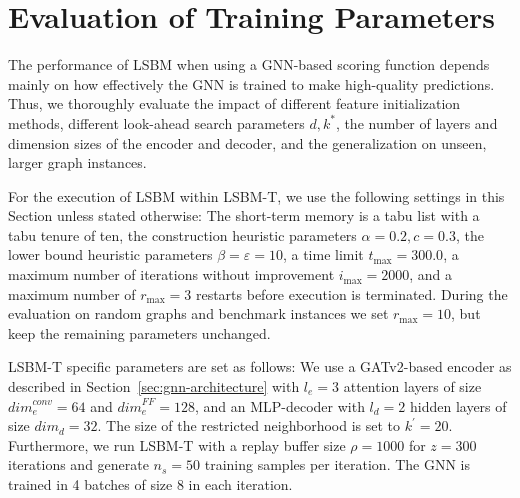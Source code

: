 \documentclass[draft,final]{vutinfth} %
\begin{document}
\begin{figure}
    
    \label{fig:bs-heuristics-random-4}
\end{figure}


\section{Evaluation of Training Parameters}\label{sec:lsbm-t}

The performance of LSBM when using a GNN-based scoring function depends mainly on how effectively the GNN is trained to make high-quality predictions. 
Thus, we thoroughly evaluate the impact of different feature initialization methods, different look-ahead search parameters $d, k^*$, the number of layers and dimension sizes of the encoder and decoder, and the generalization on unseen, larger graph instances. 

For the execution of LSBM within LSBM-T, we use the following settings in this Section unless stated otherwise: The short-term memory is a tabu list with a tabu tenure of ten, the construction heuristic parameters $\alpha=0.2, c=0.3$, the lower bound heuristic parameters $\beta=\varepsilon=10$, a time limit $t_{\max}=300.0$, a maximum number of iterations without improvement $i_{\max}=2000$, and a maximum number of $r_{\max} = 3$ restarts before execution is terminated. 
During the evaluation on random graphs and benchmark instances we set $r_{\max} = 10$, but keep the remaining parameters unchanged. 

LSBM-T specific parameters are set as follows: We use a GATv2-based encoder as described in Section~\ref{sec:gnn-architecture} with $l_e = 3$ attention layers of size $\mathit{dim}^{conv}_e = 64$ and $\mathit{dim}^{FF}_e = 128$, and an MLP-decoder with $l_d=2$ hidden layers of size $\mathit{dim}_d = 32$. The size of the restricted neighborhood is set to $k^\prime = 20$.
Furthermore, we run LSBM-T with a replay buffer size $\rho=1000$ for $z=300$ iterations and generate $n_s = 50$ training samples per iteration. The GNN is trained in 4 batches of size $8$ in each iteration. 

\end{document}

